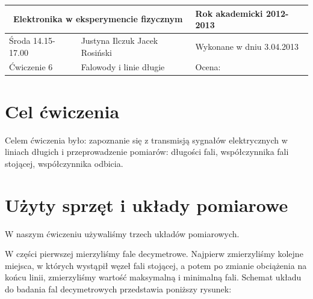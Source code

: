 \documentclass[a4paper,11pt]{article}
\begin{document}
\begin{center}

    \begin{tabular}{ | m{5cm}| m{5cm} | m{5cm} |}
    \hline 
    \multicolumn{2}{|c|}{Elektronika w eksperymencie fizycznym}
    & Rok akademicki 2012-2013 \\ 
    
    \hline
    Środa 14.15-17.00 
    & Justyna Ilczuk \newline Jacek Rosiński
    & Wykonane w dniu 3.04.2013 \\
   	
   	\hline
   	Ćwiczenie 6 & Falowody i linie długie &    Ocena: \\
   	\hline
    \end{tabular}
\end{center}

\pagestyle{fancy}
\fancyfoot[CO]{\ }
\fancyhead[RO]{\footnotesize{\thepage} }





\section{Cel ćwiczenia}
Celem ćwiczenia było:
zapoznanie się z transmisją sygnałów elektrycznych w liniach długich i przeprowadzenie pomiarów: długości fali, współczynnika fali stojącej, współczynnika odbicia.

\section{Użyty sprzęt i układy pomiarowe}
W naszym ćwiczeniu używaliśmy trzech układów pomiarowych.

W części pierwszej mierzyliśmy fale decymetrowe. Najpierw zmierzyliśmy kolejne miejsca, w których wystąpił węzeł fali stojącej,
a potem po zmianie obciążenia na końcu linii, zmierzyliśmy wartość maksymalną i minimalną fali. 
Schemat układu do badania fal decymetrowych przedstawia poniższy rysunek: 
\end{document}

